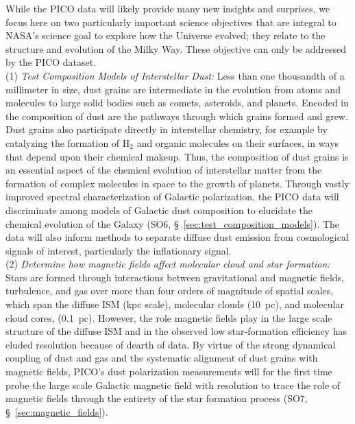\documentclass[PICOReport.tex]{subfiles}
\begin{document}
While the PICO data will likely provide many new insights and surprises, we focus here on two particularly important science objectives that are integral to NASA's science goal to explore how the Universe evolved; they relate to the structure and evolution of the Milky Way. These objective can only be addressed by the PICO dataset. \\
(1) {\em Test Composition Models of Interstellar Dust:} 
Less than one thousandth of a millimeter in size, dust grains are intermediate in the evolution from atoms and molecules to large solid bodies such as comets, asteroids, and planets. Encoded in the composition of dust are the pathways through which grains formed and grew. Dust grains also participate directly in interstellar chemistry, for example by catalyzing the formation of H$_2$ and organic molecules on their surfaces, in ways that depend upon their chemical makeup. Thus, the composition of dust grains is an essential aspect of the chemical evolution of interstellar matter from the formation of complex molecules in space to the growth of planets. Through vastly improved spectral characterization of Galactic polarization, the PICO data will discriminate among models of Galactic dust composition to elucidate the chemical evolution of the Galaxy (SO6, \S~\ref{sec:test_composition_models}). The data will also inform methods to separate diffuse dust emission from cosmological signals of interest, particularly the inflationary signal. \\
%
(2) {\em Determine how magnetic fields affect molecular cloud and star formation:}
Stars are formed through interactions between gravitational and magnetic fields, turbulence, and gas over more than four orders of magnitude of spatial scales, which span the diffuse ISM (kpc scale), molecular clouds (10~pc), and molecular cloud cores, (0.1~pc). However, the role magnetic fields play in the large scale structure of the diffuse \ac{ISM} and in the observed low star-formation efficiency has eluded resolution because of dearth of data. By virtue of the strong dynamical coupling of dust and gas and the systematic alignment of dust grains with magnetic fields, PICO's dust polarization measurements will for the first time probe the large scale Galactic magnetic field with resolution to trace the role of magnetic fields through the entirety of the star formation process (SO7, \S~\ref{sec:magnetic_fields}). 
\end{document}
